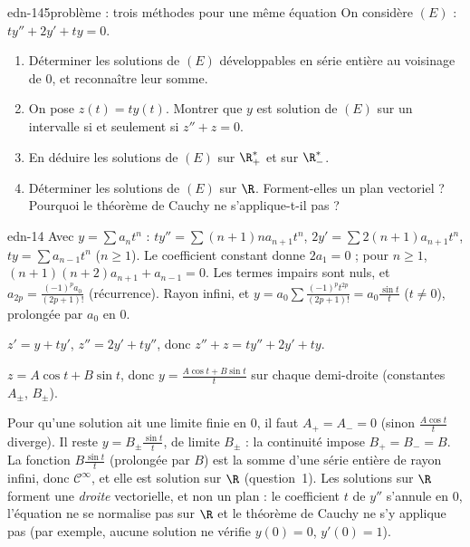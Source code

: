 \begin{exo}{edn-14}{5}{problème : trois méthodes pour une même équation}
On considère $(E)$ : $ty''+2y'+ty=0$.
\begin{enumerate}
\item Déterminer les solutions de $(E)$ développables en série entière au voisinage de $0$, et reconnaître leur somme.
\item On pose $z(t)=ty(t)$. Montrer que $y$ est solution de $(E)$ sur un intervalle si et seulement si $z''+z=0$.
\item En déduire les solutions de $(E)$ sur $\R_+^*$ et sur $\R_-^*$.
\item Déterminer les solutions de $(E)$ sur $\R$. Forment-elles un plan vectoriel ? Pourquoi le théorème de Cauchy ne
s'applique-t-il pas ?
\end{enumerate}
\end{exo}
\begin{corrige}{edn-14}
 Avec $y=\sum a_nt^n$ : $ty''=\sum(n+1)na_{n+1}t^n$, $2y'=\sum2(n+1)a_{n+1}t^n$, $ty=\sum a_{n-1}t^n$ ($n\geq1$). Le coefficient
constant donne $2a_1=0$ ; pour $n\geq1$, $(n+1)(n+2)a_{n+1}+a_{n-1}=0$. Les termes impairs sont nuls, et
$a_{2p}=\frac{(-1)^pa_0}{(2p+1)!}$ (récurrence). Rayon infini, et $y=a_0\sum\frac{(-1)^pt^{2p}}{(2p+1)!}=a_0\frac{\sin t}t$ ($t\neq0$),
prolongée par $a_0$ en $0$.

 $z'=y+ty'$, $z''=2y'+ty''$, donc $z''+z=ty''+2y'+ty$.

 $z=A\cos t+B\sin t$, donc $y=\frac{A\cos t+B\sin t}t$ sur chaque demi-droite (constantes $A_\pm$, $B_\pm$).

 Pour qu'une solution ait une limite finie en $0$, il faut $A_+=A_-=0$ (sinon $\frac{A\cos t}t$ diverge). Il reste
$y=B_\pm\frac{\sin t}t$, de limite $B_\pm$ : la continuité impose $B_+=B_-=B$. La fonction $B\frac{\sin t}t$ (prolongée par $B$) est la
somme d'une série entière de rayon infini, donc $\mathcal C^\infty$, et elle est solution sur $\R$ (question~1). Les solutions sur
$\R$ forment une \emph{droite} vectorielle, et non un plan : le coefficient $t$ de $y''$ s'annule en $0$, l'équation ne se
normalise pas sur $\R$ et le théorème de Cauchy ne s'y applique pas (par exemple, aucune solution ne vérifie $y(0)=0$, $y'(0)=1$).
\end{corrige}

